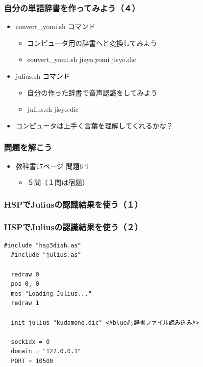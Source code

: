 \documentclass[14pt]{beamer}
\begin{document}
\begin{frame}
  \frametitle{自分の単語辞書を作ってみよう（４）}
  \begin{itemize}
    \item convert\_yomi.sh コマンド
    \begin{itemize}   
      \item コンピュータ用の辞書へと変換してみよう
      \item convert\_yomi.sh jisyo.yomi  jisyo.dic
    \end{itemize}
    \item julius.sh コマンド
    \begin{itemize}
      \item 自分の作った辞書で音声認識をしてみよう
      \item julius.sh jisyo.dic
    \end{itemize}
    \item コンピュータは上手く言葉を理解してくれるかな？
  \end{itemize}
\end{frame}

\begin{frame}
  \frametitle{問題を解こう}
  \begin{itemize}
    \item 教科書17ページ 問題6-9
    \begin{itemize}
      \item ５問（１問は宿題）
    \end{itemize}
  \end{itemize}
\end{frame}

\begin{frame}
  \frametitle{HSPでJuliusの認識結果を使う（１）}
  \begin{figure}
    
  \end{figure}
\end{frame}

\begin{frame}[fragile]
  \frametitle{HSPでJuliusの認識結果を使う（２）}
  \begin{lstlisting}[caption=julius.hsp,label=julius.hsp]
  #include "hsp3dish.as"
  #include "julius.as"

  redraw 0
  pos 0, 0
  mes "Loading Julius..."
  redraw 1

  init_julius "kudamono.dic" <#blue#;辞書ファイル読み込み#>

  sockidx = 0
  domain = "127.0.0.1"
  PORT = 10500
  \end{lstlisting}
\end{frame}
\end{document}
